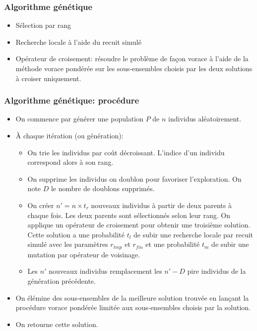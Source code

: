 \documentclass[aspectratio=169,11pt]{beamer}
\begin{document}
	\begin{frame}
		\frametitle{Algorithme génétique}
		\begin{itemize}
			\item Sélection par rang
			\item Recherche locale à l'aide du recuit simulé
			\item Opérateur de croisement: résoudre le problème de façon vorace à l'aide de la méthode vorace pondérée
				sur les sous-ensembles choisis par les deux solutions à croiser uniquement.
		\end{itemize}
	\end{frame}

	\begin{frame}
		\frametitle{Algorithme génétique: procédure}
		\begin{itemize}
			\item On commence par générer une population \(P\) de \(n\) individus aléatoirement.
			\item À chaque itération (ou génération):
				\begin{itemize}
					\item On trie les individus par coût décroissant. L'indice d'un individu correspond alors à son rang.
					\item On supprime les individus on doublon pour favoriser l'exploration. On note \(D\) le nombre de doublons supprimés.
					\item On créer \(n' = n \times t_r\) nouveaux individus à partir de deux parents à chaque fois.
						Les deux parents sont sélectionnés selon leur rang. On applique un opérateur de croisement
						pour obtenir une troisième solution. Cette solution a une probabilité \(t_l\) de subir une
						recherche locale par recuit simulé avec les paramètres \(r_{tmp}\) et \(r_{fin}\) et une probabilité
						\(t_m\) de subir une mutation par opérateur de voisinage.
					\item Les \(n'\) nouveaux individus remplacement les \(n' - D\) pire individus de la génération précédente.
				\end{itemize}
			\item On élémine des sous-ensembles de la meilleure solution trouvée en lançant la procédure vorace pondérée limitée
				aux sous-ensembles choisis par la solution.
			\item On retourne cette solution.
		\end{itemize}
	\end{frame}

\end{document}
